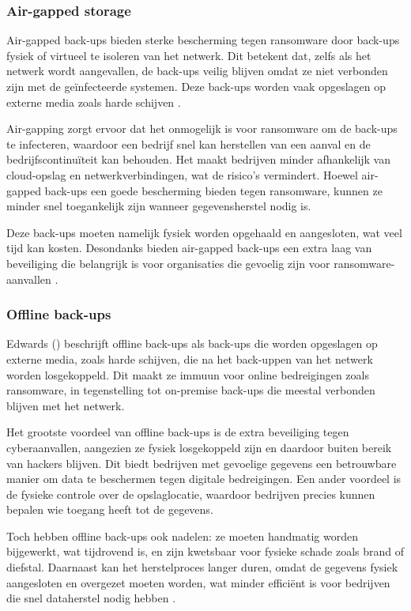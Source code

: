 \subsubsection{Air-gapped storage}
Air-gapped back-ups bieden sterke bescherming tegen ransomware door back-ups fysiek of virtueel te isoleren van het netwerk. Dit betekent dat, zelfs als het netwerk wordt aangevallen, de back-ups veilig blijven omdat ze niet verbonden zijn met de geïnfecteerde systemen. Deze back-ups worden vaak opgeslagen op externe media zoals harde schijven \autocite{Bryant2015}. 

Air-gapping zorgt ervoor dat het onmogelijk is voor ransomware om de back-ups te infecteren, waardoor een bedrijf snel kan herstellen van een aanval en de bedrijfscontinuïteit kan behouden. Het maakt bedrijven minder afhankelijk van cloud-opslag en netwerkverbindingen, wat de risico’s vermindert. Hoewel air-gapped back-ups een goede bescherming bieden tegen ransomware, kunnen ze minder snel toegankelijk zijn wanneer gegevensherstel nodig is. 

Deze back-ups moeten namelijk fysiek worden opgehaald en aangesloten, wat veel tijd kan kosten. Desondanks bieden air-gapped back-ups een extra laag van beveiliging die belangrijk is voor organisaties die gevoelig zijn voor ransomware-aanvallen \autocite{Park2023}.

\subsubsection{Offline back-ups}
Edwards (\citeyear{Edwards2022}) beschrijft offline back-ups als back-ups die worden opgeslagen op externe media, zoals harde schijven, die na het back-uppen van het netwerk worden losgekoppeld. Dit maakt ze immuun voor online bedreigingen zoals ransomware, in tegenstelling tot on-premise back-ups die meestal verbonden blijven met het netwerk. 

Het grootste voordeel van offline back-ups is de extra beveiliging tegen cyberaanvallen, aangezien ze fysiek losgekoppeld zijn en daardoor buiten bereik van hackers blijven. Dit biedt bedrijven met gevoelige gegevens een betrouwbare manier om data te beschermen tegen digitale bedreigingen. Een ander voordeel is de fysieke controle over de opslaglocatie, waardoor bedrijven precies kunnen bepalen wie toegang heeft tot de gegevens. 

Toch hebben offline back-ups ook nadelen: ze moeten handmatig worden bijgewerkt, wat tijdrovend is, en zijn kwetsbaar voor fysieke schade zoals brand of diefstal. Daarnaast kan het herstelproces langer duren, omdat de gegevens fysiek aangesloten en overgezet moeten worden, wat minder efficiënt is voor bedrijven die snel dataherstel nodig hebben \autocite{James2019}. 

